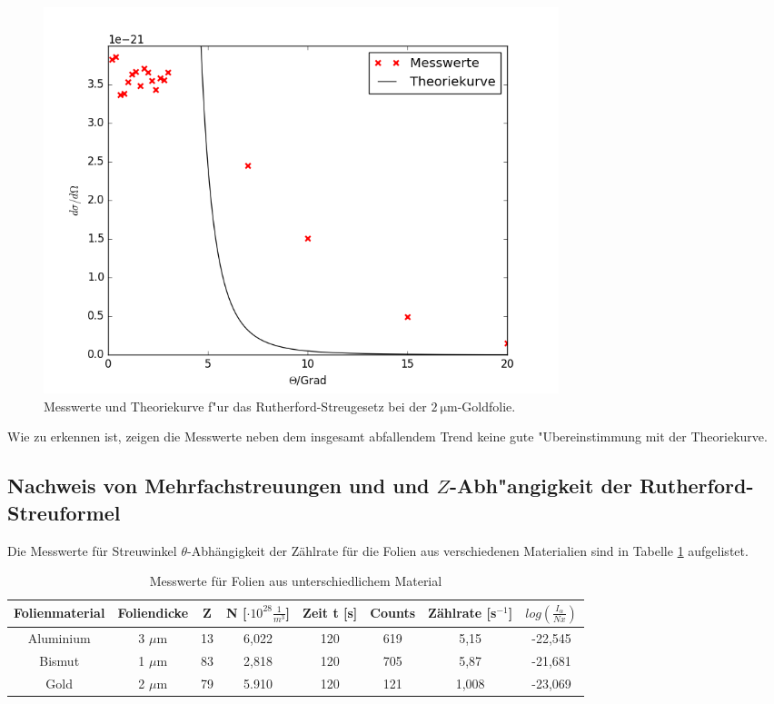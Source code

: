   \begin{figure}
    \centering
    \includegraphics[width=15cm]{skripte/ruther.png}
    \caption{Messwerte und Theoriekurve f"ur das Rutherford-Streugesetz bei der $\SI{2}{\micro \meter}$-Goldfolie.}
    \label{plot:ruther}
  \end{figure}

  Wie zu erkennen ist, zeigen die Messwerte neben dem insgesamt abfallendem Trend keine gute "Ubereinstimmung mit der Theoriekurve.

  \newpage



  \subsection{Nachweis von Mehrfachstreuungen und und $Z$-Abh"angigkeit der Rutherford-Streuformel}



Die Messwerte für Streuwinkel $\theta$-Abhängigkeit der Zählrate für die Folien aus verschiedenen Materialien sind in Tabelle \ref{tab:werte} aufgelistet.

\begin{table}[H] 
\centering
\begin{tabular}{c|c c c c c c c}

	Folienmaterial & Foliendicke & Z & N [$\cdot 10^{28} \frac{1}{m^3}$]& Zeit t [s]& Counts & Zählrate [s$^{-1}$] & $log(\frac{I_\alpha}{Nx})$ \\ 
	\hline 
	Aluminium & 3 $\mu$m & 13 & 6,022 & 120  & 619 & 5,15 & -22,545 \\ 

	Bismut &1 $\mu$m & 83 & 2,818 & 120 & 705 & 5,87 & -21,681\\ 

	Gold & 2 $\mu$m& 79 &  5.910 & 120 & 121 & 1,008 & -23,069\\ 

\end{tabular} 
	\caption{Messwerte für Folien aus unterschiedlichem Material} 
	\label{tab:werte}
\end{table}
 

